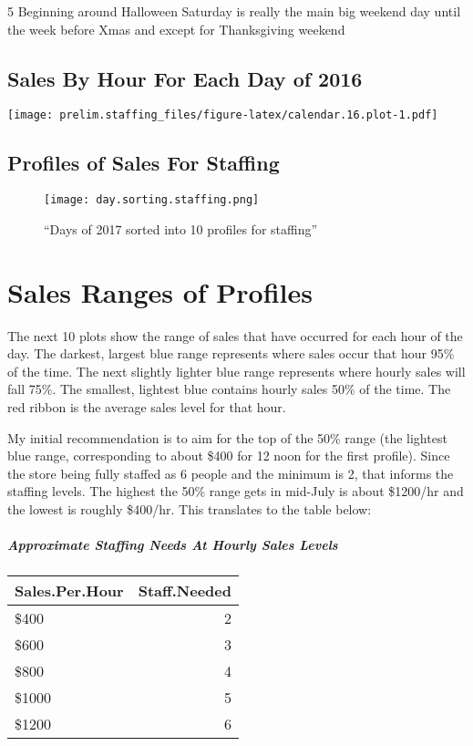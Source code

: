 \documentclass[]{article}
\let\oldsubparagraph\subparagraph
\renewcommand{\subparagraph}[1]{\oldsubparagraph{#1}\mbox{}}
\begin{document}
5 Beginning around Halloween Saturday is really the main big weekend day
until the week before Xmas and except for Thanksgiving weekend

\subsection{Sales By Hour For Each Day of
2016}\label{sales-by-hour-for-each-day-of-2016}

\texttt{[image: prelim.staffing\_files/figure-latex/calendar.16.plot-1.pdf]}

\subsection{Profiles of Sales For
Staffing}\label{profiles-of-sales-for-staffing}

\begin{figure}
\centering
\texttt{[image: day.sorting.staffing.png]}
\caption{``Days of 2017 sorted into 10 profiles for staffing''}
\end{figure}

\newpage

\section{Sales Ranges of Profiles}\label{sales-ranges-of-profiles}

The next 10 plots show the range of sales that have occurred for each
hour of the day. The darkest, largest blue range represents where sales
occur that hour 95\% of the time. The next slightly lighter blue range
represents where hourly sales will fall 75\%. The smallest, lightest
blue contains hourly sales 50\% of the time. The red ribbon is the
average sales level for that hour.

My initial recommendation is to aim for the top of the 50\% range (the
lightest blue range, corresponding to about \$400 for 12 noon for the
first profile). Since the store being fully staffed as 6 people and the
minimum is 2, that informs the staffing levels. The highest the 50\%
range gets in mid-July is about \$1200/hr and the lowest is roughly
\$400/hr. This translates to the table below:

\subparagraph{Approximate Staffing Needs At Hourly Sales
Levels}\label{approximate-staffing-needs-at-hourly-sales-levels}

\begin{longtable}[]{@{}lr@{}}
\toprule
Sales.Per.Hour & Staff.Needed\tabularnewline
\midrule
\endhead
\$400 & 2\tabularnewline
\$600 & 3\tabularnewline
\$800 & 4\tabularnewline
\$1000 & 5\tabularnewline
\$1200 & 6\tabularnewline
\bottomrule
\end{longtable}
\end{document}

